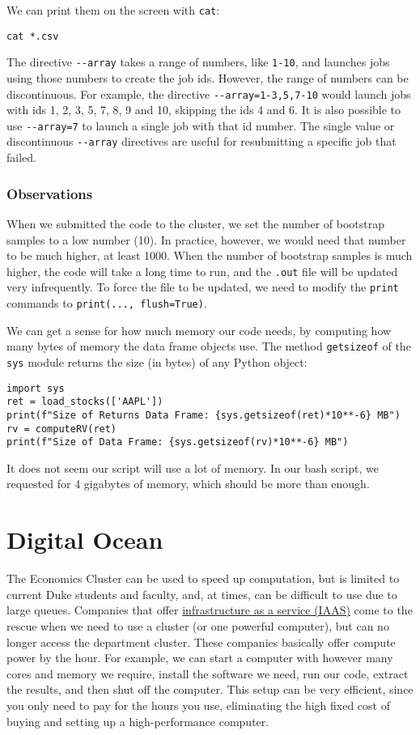 \documentclass[12pt, a4paper]{article}
\begin{document}
We can print them on the screen with \texttt{cat}:
\lstset{language=bash,label= ,caption= ,captionpos=b,firstnumber=1,numbers=left,style=bash}
\begin{lstlisting}
cat *.csv
\end{lstlisting}
The directive \texttt{-{}-array} takes a range of numbers, like \texttt{1-10}, and launches jobs using those numbers to create the job ids.
However, the range of numbers can be discontinuous.
For example, the directive \texttt{-{}-array=1-3,5,7-10} would launch jobs with ids 1, 2, 3, 5, 7, 8, 9 and 10, skipping the ids 4 and 6.
It is also possible to use \texttt{-{}-array=7} to launch a single job with that id number.
The single value or discontinuous \texttt{-{}-array} directives are useful for resubmitting a specific job that failed.
\subsubsection{Observations}
\label{sec:org7ee78a7}
When we submitted the code to the cluster, we set the number of bootstrap samples to a low number (10).
In practice, however, we would need that number to be much higher, at least 1000.
When the number of bootstrap samples is much higher, the code will take a long time to run, and the \texttt{.out} file will be updated very infrequently.
To force the file to be updated, we need to modify the \texttt{print} commands to \texttt{print(..., flush=True)}.

We can get a sense for how much memory our code needs, by computing how many bytes of memory the data frame objects use.
The method \texttt{getsizeof} of the \texttt{sys} module returns the size (in bytes) of any Python object:
\lstset{language=jupyter-python,label= ,caption= ,captionpos=b,numbers=none}
\begin{lstlisting}
import sys
ret = load_stocks(['AAPL'])
print(f"Size of Returns Data Frame: {sys.getsizeof(ret)*10**-6} MB")
rv = computeRV(ret)
print(f"Size of Data Frame: {sys.getsizeof(rv)*10**-6} MB")
\end{lstlisting}
It does not seem our script will use a lot of memory.
In our bash script, we requested for 4 gigabytes of memory, which should be more than enough.
\section{Digital Ocean}
\label{sec:org189c16f}
The Economics Cluster can be used to speed up computation, but is limited to current Duke students and faculty, and, at times, can be difficult to use due to large queues.
Companies that offer \href{https://en.wikipedia.org/wiki/Infrastructure\_as\_a\_service}{infrastructure as a service (IAAS)} come to the rescue when we need to use a cluster (or one powerful computer), but can no longer access the department cluster.
These companies basically offer compute power by the hour.
For example, we can start a computer with however many cores and memory we require, install the software we need, run our code, extract the results, and then shut off the computer.
This setup can be very efficient, since you only need to pay for the hours you use, eliminating the high fixed cost of buying and setting up a high-performance computer.
\end{document}
